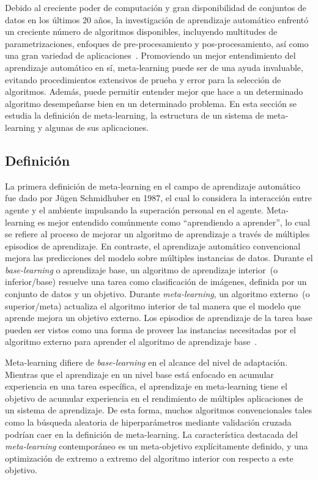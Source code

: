 Debido al creciente poder de computación y gran disponibilidad de conjuntos de
datos en los últimos 20 años, la investigación de aprendizaje automático
enfrentó un creciente número de algoritmos disponibles, incluyendo multitudes
de parametrizaciones, enfoques de pre-procesamiento y pos-procesamiento, así
como una gran variedad de aplicaciones~.
Promoviendo un mejor entendimiento del aprendizaje automático en sí,
meta-learning puede ser de una ayuda invaluable, evitando procedimientos
extensivos de prueba y error para la selección de algoritmos. Además, puede
permitir entender mejor que hace a un determinado algoritmo desempeñarse bien
en un determinado problema. En esta sección se estudia la definición de
meta-learning, la estructura de un sistema de meta-learning y algunas de sus
aplicaciones.

\subsection{Definición}\label{subsec:meta-definition}

La primera definición de meta-learning en el campo de aprendizaje automático
fue dado por J\"ugen Schmidhuber en 1987, el cual lo considera la interacción
entre agente y el ambiente impulsando la superación personal en el agente.
Meta-learning es mejor entendido comúnmente como ``aprendiendo a aprender'',
lo cual se refiere al proceso de mejorar un algoritmo de aprendizaje a través
de múltiples episodios de aprendizaje. En contraste, el aprendizaje automático
convencional mejora las predicciones del modelo sobre múltiples instancias de
datos. Durante el \textit{base-learning} o aprendizaje base, un algoritmo de
aprendizaje interior~(o inferior/base) resuelve una tarea como clasificación
de imágenes, definida por un conjunto de datos y un objetivo. Durante
\emph{meta-learning}, un algoritmo externo~(o superior/meta) actualiza el
algoritmo interior de tal manera que el modelo que aprende mejora un objetivo
externo. Los episodios de aprendizaje de la tarea base pueden ser vistos como
una forma de proveer las instancias necesitadas por el algoritmo externo para
aprender el algoritmo de aprendizaje base~.

Meta-learning difiere de \textit{base-learning} en el alcance del nivel de
adaptación. Mientras que el aprendizaje en un nivel base está enfocado en
acumular experiencia en una tarea específica, el aprendizaje en meta-learning
tiene el objetivo de acumular experiencia en el rendimiento de múltiples
aplicaciones de un sistema de aprendizaje. De esta forma, muchos algoritmos
convencionales tales como la búsqueda aleatoria de hiperparámetros mediante
validación cruzada podrían caer en la definición de meta-learning. La
característica destacada del \emph{meta-learning} contemporáneo es un
meta-objetivo explícitamente definido, y una optimización de extremo a extremo
del algoritmo interior con respecto a este objetivo.

